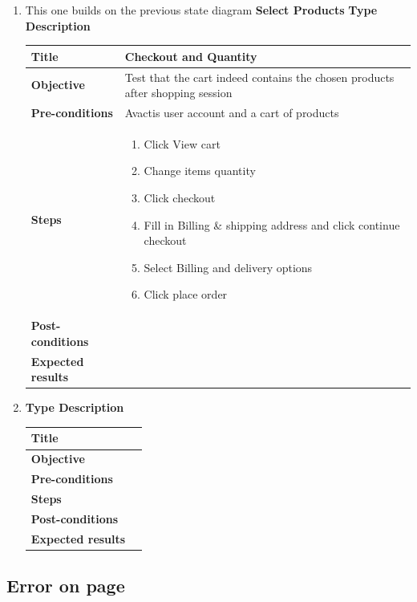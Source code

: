 \documentclass[UKenglish,12pt]{article}
\begin{document}
\begin{enumerate}
\item
This one builds on the previous state diagram \textbf{Select Products}\newline
\textbf{\hspace{0.3cm}Type\hspace{4.4cm} Description}
\newline \vspace{0.2cm}
\begin{tabular}{| p{5cm} | p{10cm} | }
	\hline
	 \textbf{Title} & Checkout and Quantity \\ \hline
	 \textbf{Objective} & Test that the cart indeed contains the chosen products after shopping session \\ \hline
	 \textbf{Pre-conditions} & Avactis user account and a cart of products \\ \hline
	 \textbf{Steps} & \begin{enumerate} \item Click View cart \item Change items quantity \item Click checkout \item Fill in Billing \& shipping address and click continue checkout \item Select Billing and delivery options \item Click place order
	 \end{enumerate} \\ \hline
	 \textbf{Post-conditions} & \\ \hline
	 \textbf{Expected results} & \\ 
	 \hline
\end{tabular} %



\item
\textbf{\hspace{0.3cm}Type\hspace{4.4cm} Description}
\newline \vspace{0.2cm}
\begin{tabular}{| p{5cm} | p{10cm} | }
	\hline
	 \textbf{Title} & \\ \hline
	 \textbf{Objective} & \\ \hline
	 \textbf{Pre-conditions} & \\ \hline
	 \textbf{Steps} & \\ \hline
	 \textbf{Post-conditions} & \\ \hline
	 \textbf{Expected results} & \\ 
	 \hline
\end{tabular} %









\end{enumerate}

\subsection{Error on page}
\end{document}
